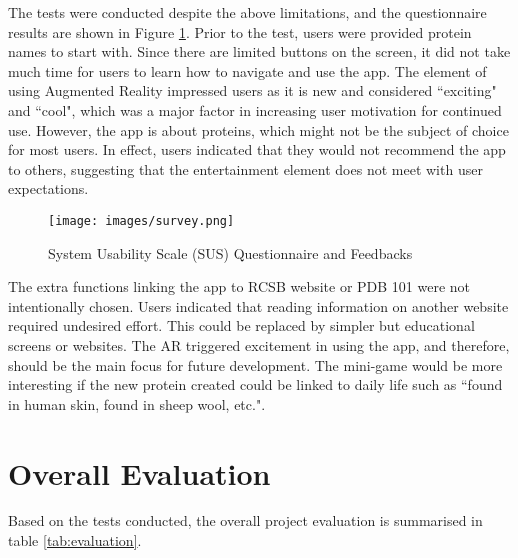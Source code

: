 The tests were conducted despite the above limitations, and the questionnaire results are shown in Figure \ref{fig:survey}. Prior to the test, users were provided protein names to start with. Since there are limited buttons on the screen, it did not take much time for users to learn how to navigate and use the app. The element of using Augmented Reality impressed users as it is new and considered ``exciting" and ``cool", which was a major factor in increasing user motivation for continued use. However, the app is about proteins, which might not be the subject of choice for most users. In effect, users indicated that they would not recommend the app to others, suggesting that the entertainment element does not meet with user expectations. 

 \begin{figure}[!htp]
	\centering
	\texttt{[image: images/survey.png]}
	\caption{System Usability Scale (SUS) Questionnaire and Feedbacks}
	\label{fig:survey}
\end{figure}

The extra functions linking the app to RCSB website or PDB 101 were not intentionally chosen. Users indicated that reading information on another website required undesired effort. This could be replaced by simpler but educational screens or websites. The AR triggered excitement in using the app, and therefore, should be the main focus for future development. The mini-game would be more interesting if the new protein created could be linked to daily life such as ``found in human skin, found in sheep wool, etc.". 

\section{Overall Evaluation}
Based on the tests conducted, the overall project evaluation is summarised in table \ref{tab:evaluation}.

